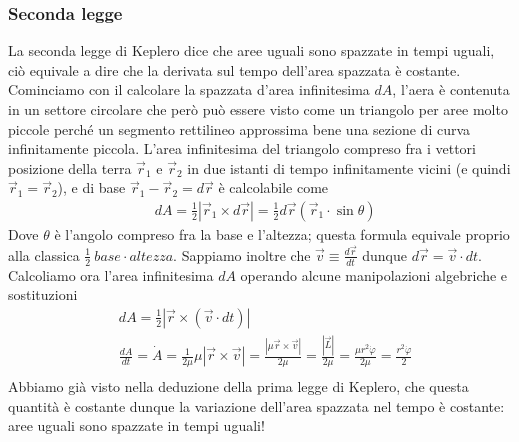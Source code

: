 \documentclass[10pt,a4paper]{article}
\begin{document}
\subsubsection{Seconda legge}
La seconda legge di Keplero dice che aree uguali sono spazzate in tempi uguali, ciò equivale a dire che la derivata sul tempo dell'area spazzata è costante. Cominciamo con il calcolare la spazzata d'area infinitesima $dA$, l'aera è contenuta in un settore circolare che però può essere visto come un triangolo per aree molto piccole perché un segmento rettilineo approssima bene una sezione di curva infinitamente piccola. L'area infinitesima del triangolo compreso fra i vettori posizione della terra $\vec{r}_1$ e $\vec{r}_2$ in due istanti di tempo infinitamente vicini (e quindi $\vec{r}_1=\vec{r}_2$), e di base $\vec{r}_1-\vec{r}_2 = d\vec{r}$ è calcolabile come 
\begin{align*}
	&dA = \frac{1}{2}|\vec{r}_1\times d\vec{r}|=\frac{1}{2}d\vec{r}(\vec{r}_1 \cdot \sin\theta)
\end{align*}
Dove $\theta$ è l'angolo compreso fra la base e l'altezza; questa formula equivale proprio alla classica $\frac{1}{2}\  base \cdot altezza$.
Sappiamo inoltre che $\vec{v}\equiv \frac{d\vec{r}}{dt}$ dunque $d\vec{r} = \vec{v}\cdot dt$. Calcoliamo ora l'area infinitesima $dA$ operando alcune manipolazioni algebriche e sostituzioni
\begin{align*}
&dA = \frac{1}{2}|\vec{r}\times( \vec{v}\cdot dt)|\\
&\frac{dA}{dt} =\dot{A} = \frac{1}{2\mu}\mu|\vec{r}\times \vec{v}|= \frac{|\mu \vec{r}\times \vec{v}|}{2\mu}= \frac{|\vec{L}|}{2\mu}= \frac{\mu r^2\dot\varphi}{2\mu}=\frac{r^2\dot\varphi}{2} \\
\end{align*}
Abbiamo già visto nella deduzione della prima legge di Keplero, che questa quantità è costante dunque la variazione dell'area spazzata nel tempo è costante: aree uguali sono spazzate in tempi uguali!
\end{document}
